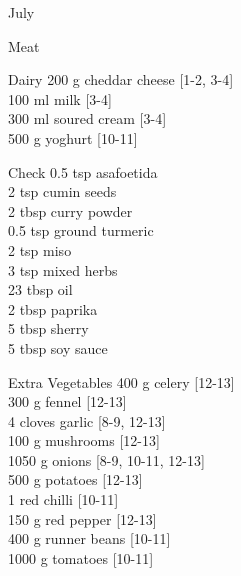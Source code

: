 \begin{menu}{July}
\begin{shoppinglist}{Meat}
      \end{shoppinglist}%
      \begin{shoppinglist}{Dairy}
      200 g cheddar cheese {\scriptsize[1-2, 3-4]}\\
      100 ml milk {\scriptsize[3-4]}\\
      300 ml soured cream {\scriptsize[3-4]}\\
      500 g yoghurt {\scriptsize[10-11]}\\
      \end{shoppinglist}%
      \par\vfil %
      \vfil\clearpage %
      \begin{shoppinglist}{Check}
      0.5 tsp asafoetida \\
      2 tsp cumin seeds \\
      2 tbsp curry powder \\
      0.5 tsp ground turmeric \\
      2 tsp miso \\
      3 tsp mixed herbs \\
      23 tbsp oil \\
      2 tbsp paprika \\
      5 tbsp sherry \\
      5 tbsp soy sauce \\
      \end{shoppinglist}%
      \begin{shoppinglist}{Extra Vegetables}
      400 g celery {\scriptsize[12-13]}\\
      300 g fennel {\scriptsize[12-13]}\\
      4 cloves garlic {\scriptsize[8-9, 12-13]}\\
      100 g mushrooms {\scriptsize[12-13]}\\
      1050 g onions {\scriptsize[8-9, 10-11, 12-13]}\\
      500 g potatoes {\scriptsize[12-13]}\\
      1  red chilli {\scriptsize[10-11]}\\
      150 g red pepper {\scriptsize[12-13]}\\
      400 g runner beans {\scriptsize[10-11]}\\
      1000 g tomatoes {\scriptsize[10-11]}\\
      \end{shoppinglist}%
      \par\vfil %
    \vfil\clearpage
  

\end{menu}
